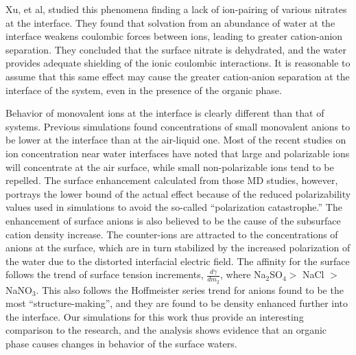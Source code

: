 Xu, et al, studied this phenomena finding a lack of ion-pairing of various nitrates at the \airwat interface.\cite{Xu2009} They found that solvation from an abundance of water at the interface weakens coulombic forces between ions, leading to greater cation-anion separation. They concluded that the surface nitrate is dehydrated, and the water provides adequate shielding of the ionic coulombic interactions. It is reasonable to assume that this same effect may cause the greater cation-anion separation at the interface of the \sodnit system, even in the presence of the organic phase.

Behavior of monovalent ions at the \ctcwat interface is clearly different than that of \airwat systems. Previous simulations found concentrations of small monovalent anions to be lower at the \ctcwat interface than at the air-liquid one.\cite{Wick2007a} Most of the recent studies on ion concentration near water interfaces have noted that large and polarizable ions will concentrate at the air surface,\cite{Petersen2005b,Pegram2006,Sloutskin2007,Eggimann2008} while small non-polarizable ions tend to be repelled. The surface enhancement calculated from those MD studies, however, portrays the lower bound of the actual effect because of the reduced polarizability values used in simulations to avoid the so-called ``polarization catastrophe.'' The enhancement of surface anions is also believed to be the cause of the subsurface cation density increase. The counter-ions are attracted to the concentrations of anions at the surface, which are in turn stabilized by the increased polarization of the water due to the distorted interfacial electric field. The affinity for the surface follows the trend of surface tension increments, $\frac{d\gamma}{dm_2}$, where Na$_2$SO$_4 >$ NaCl $>$ NaNO$_3$.\cite{Pegram2006} This also follows the Hoffmeister series trend for anions found to be the most ``structure-making'', and they are found to be density enhanced further into the interface. Our simulations for this work thus provide an interesting comparison to the \airwat research, and the analysis shows evidence that an organic phase causes changes in behavior of the surface waters.


